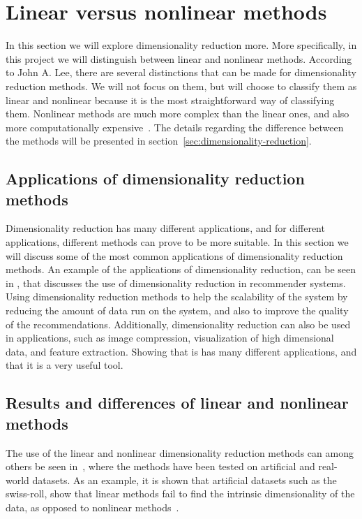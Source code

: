 \section{Linear versus nonlinear methods}\label{sec:linear-vs-nonlinear}

In this section we will explore dimensionality reduction more. More specifically, in this project we will distinguish between linear and nonlinear methods. According to John A. Lee, there are several distinctions that can be made for dimensionality reduction methods\cite{nonlinear-dim-red-chapter-two}. We will not focus on them, but will choose to classify them as linear and nonlinear because it is the most straightforward way of classifying them. Nonlinear methods are much more complex than the linear ones, and also more computationally expensive~\cite{nonlinear-dim-red-chapter-two}. The details regarding the difference between the methods will be presented in section~\ref{sec:dimensionality-reduction}.

\subsection{Applications of dimensionality reduction methods}

Dimensionality reduction has many different applications, and for different applications, different methods can prove to be more suitable. In this section we will discuss some of the most common applications of dimensionality reduction methods. An example of the applications of dimensionality reduction, can be seen in \cite{sarwar2000application}, that discusses the use of dimensionality reduction in recommender systems. Using dimensionality reduction methods to help the scalability of the system by reducing the amount of data run on the system, and also to improve the quality of the recommendations. Additionally, dimensionality reduction can also be used in applications, such as image compression, visualization of high dimensional data, and feature extraction. Showing that is has many different applications, and that it is a very useful tool.


\subsection{Results and differences of linear and nonlinear methods}

The use of the linear and nonlinear dimensionality reduction methods can among others be seen in~\cite{dimensionality-reduction-comparative-review, tennenbaum}, where the methods have been tested on artificial and real-world datasets. As an example, it is shown that artificial datasets such as the swiss-roll, show that linear methods fail to find the intrinsic dimensionality of the data, as opposed to nonlinear methods~\cite{tennenbaum}.

